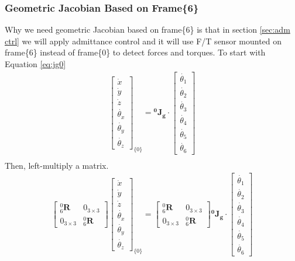 \subsubsection{Geometric Jacobian Based on Frame\{6\}}
\label{sec:jg6}
Why we need geometric Jacobian based on frame\{6\} is that in section \ref{sec:adm ctrl} we will apply admittance control and it will use F/T sensor mounted on frame\{6\} instead of frame\{0\} to detect forces and torques. To start with Equation \ref{eq:jg0}
\begin{equation}
\begin{split}
\begin{bmatrix}
\dot{x}\\
\dot{y}\\
\dot{z}\\
\dot{\theta _x}\\
\dot{\theta _y}\\
\dot{\theta _z}
\end{bmatrix}_{\!\{0\}}
=
\mathbf{^0\!J_g} \cdot 
\begin{bmatrix}
\dot{\theta _1} \\ 
\dot{\theta _2} \\ 
\dot{\theta _3} \\ 
\dot{\theta _4} \\ 
\dot{\theta _5} \\ 
\dot{\theta _6} 
\end{bmatrix}\\
\end{split}
\end{equation}
Then, left-multiply a matrix. 
\begin{equation}
\label{eq:jg6_leftmul}
\begin{split}
\begin{bmatrix}
^0_6\mathbf{R} & 0_{ 3\times 3} \\ 
0_{ 3\times 3} & ^0_6\mathbf{R}
\end{bmatrix}
\begin{bmatrix}
\dot{x}\\
\dot{y}\\
\dot{z}\\
\dot{\theta _x}\\
\dot{\theta _y}\\
\dot{\theta _z}
\end{bmatrix}_{\!\{0\}}
=
\begin{bmatrix}
^0_6\mathbf{R} & 0_{ 3\times 3} \\ 
0_{ 3\times 3} & ^0_6\mathbf{R}
\end{bmatrix}
\mathbf{^0\!J_g} \cdot 
\begin{bmatrix}
\dot{\theta _1} \\ 
\dot{\theta _2} \\ 
\dot{\theta _3} \\ 
\dot{\theta _4} \\ 
\dot{\theta _5} \\ 
\dot{\theta _6} 
\end{bmatrix}\\
\end{split}
\end{equation}
